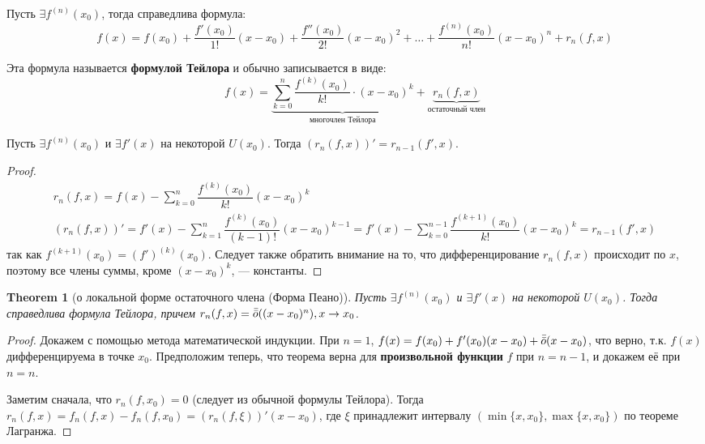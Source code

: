\documentclass[a4paper]{article}
\theoremstyle{named}
\newtheorem*{namedtheorem}{Theorem}
\begin{document}
\begin{colloq}
		Пусть $\exists f^{(n)}(x_0)$, тогда справедлива формула:
		\begin{equation*}
			f(x) = f(x_0) + \dfrac{f'(x_0)}{1!}(x - x_0) + \dfrac{f''(x_0)}{2!}(x - x_0)^2 + \dots + \dfrac{f^{(n)}(x_0)}{n!}(x - x_0)^n + r_n(f, x)
		\end{equation*}

		Эта формула называется \textbf{формулой Тейлора} и обычно записывается в виде:
		\begin{equation*}
			f(x) = \underbrace{\sum_{k = 0}^n \dfrac{f^{(k)}(x_0)}{k!} \cdot (x - x_0)^k}_{\text{многочлен Тейлора}} + \underbrace{r_n(f, x)}_{\text{остаточный член}}
		\end{equation*}

		\begin{lemma}
			Пусть $\exists f^{(n)}(x_0)$ и $\exists f'(x)$ на некоторой $U(x_0)$. Тогда $(r_n(f, x))' = r_{n - 1}(f', x)$.
		\end{lemma}

		\begin{proof}
			\[\begin{gathered}
				r_n(f, x) = f(x) - \sum_{k = 0}^n \dfrac{f^{(k)}(x_0)}{k!} (x - x_0)^k \\
				(r_n(f, x))' = f'(x) - \sum_{k = 1}^n \dfrac{f^{(k)}(x_0)}{(k - 1)!} (x - x_0)^{k - 1}
				= f'(x) - \sum_{k = 0}^{n - 1} \dfrac{f^{(k + 1)}(x_0)}{k!}(x - x_0)^k = r_{n - 1}(f', x)
			\end{gathered}\]
			так как $f^{(k + 1)}(x_0) = (f')^{(k)}(x_0)$. Следует также обратить внимание на то, что дифференцирование $r_n(f, x)$ происходит по $x$, поэтому все члены суммы, кроме $(x - x_0)^k$, --- константы.
		\end{proof}

		\begin{namedtheorem}[о локальной форме остаточного члена (Форма Пеано)]
			Пусть $\exists f^{(n)}(x_0)$ и $\exists f'(x)$ на некоторой $U(x_0)$. Тогда справедлива формула Тейлора, причем $r_n(f, x) = \bar{\bar{o}}((x - x_0)^n), x \to x_0$.
		\end{namedtheorem}

		\begin{proof}
			Докажем с помощью метода математической индукции. При $n = 1$, $f(x) = f(x_0) + f'(x_0)(x - x_0) + \bar{\bar{o}}(x - x_0)$, что верно, т.к. $f(x)$ дифференцируема в точке $x_0$. Предположим теперь, что теорема верна для \textbf{произвольной функции} $f$ при $n = n - 1$, и докажем её при $n = n$.

			Заметим сначала, что $r_n(f, x_0) = 0$ (следует из обычной формулы Тейлора). Тогда $r_n(f, x) = f_n(f, x) - f_n(f, x_0) = (r_n(f, \xi))'(x - x_0)$, где $\xi$ принадлежит интервалу $(\min\{x, x_0\}, \max\{x, x_0\})$ по теореме Лагранжа.


\end{proof}
\end{colloq}
\end{document}
